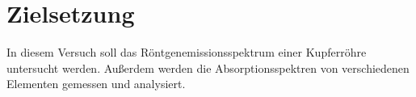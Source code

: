 \section{Zielsetzung}

\label{sec:Zielsetzung}


In diesem Versuch soll das Röntgenemissionsspektrum einer Kupferröhre untersucht werden. Außerdem werden
die Absorptionsspektren von verschiedenen Elementen gemessen und analysiert.
